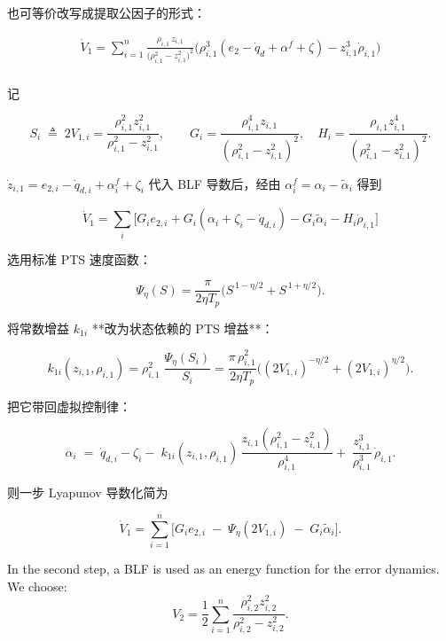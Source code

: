 \documentclass[pdflatex,sn-mathphys-num]{sn-jnl}%
\theoremstyle{thmstyleone}%
\theoremstyle{thmstyletwo}%
\theoremstyle{thmstylethree}%
\begin{document}
也可等价改写成提取公因子的形式：

\begin{equation}\label{eq:25}
	\begin{aligned}
\dot V_1
=\sum_{i=1}^{n}
\frac{\rho_{i,1}\,z_{i,1}}{\big(\rho_{i,1}^{2}-z_{i,1}^{2}\big)^{2}}
\Big(\rho_{i,1}^{3}(e_{2} -\dot{q}_{d}+\alpha^{f}+\zeta)-z_{i,1}^{3}\dot\rho_{i,1}\Big)\\
\end{aligned}
\end{equation}




记

$$
S_i \;\triangleq\;2V_{1,i}=\frac{\rho_{i,1}^2 z_{i,1}^2}{\rho_{i,1}^2-z_{i,1}^2},\qquad
G_i=\frac{\rho_{i,1}^4 z_{i,1}}{(\rho_{i,1}^2-z_{i,1}^2)^2},\quad
H_i=\frac{\rho_{i,1} z_{i,1}^4}{(\rho_{i,1}^2-z_{i,1}^2)^2}.
$$

$\dot z_{i,1}= e_{2,i}-\dot q_{d,i}+\alpha^{f}_i+\zeta_i$ 代入 BLF 导数后，经由
$\alpha^{f}_i=\alpha_i-\tilde\alpha_i$ 得到

$$
\dot V_1=\sum_i\!\Big[G_i e_{2,i}+G_i(\alpha_i+\zeta_i-\dot q_{d,i})-G_i\tilde\alpha_i-H_i\dot\rho_{i,1}\Big]
$$

选用标准 PTS 速度函数：

$$
\Psi_\eta(S)=\frac{\pi}{2\eta T_p}\Big(S^{\,1-\eta/2}+S^{\,1+\eta/2}\Big).
$$

将常数增益 $k_{1i}$ **改为状态依赖的 PTS 增益**：

$$
\boxed{
k_{1i}(z_{i,1},\rho_{i,1})
=\rho_{i,1}^2\;\frac{\Psi_\eta(S_i)}{S_i}
=\frac{\pi\,\rho_{i,1}^2}{2\eta T_p}\Big((2V_{1,i})^{-\eta/2}+(2V_{1,i})^{\eta/2}\Big).
}
$$

把它带回虚拟控制律：

$$
\boxed{
\alpha_i \;=\; \dot q_{d,i}-\zeta_i
-\;k_{1i}(z_{i,1},\rho_{i,1})\,
\frac{z_{i,1}(\rho_{i,1}^2-z_{i,1}^2)}{\rho_{i,1}^4}
+\;\frac{z_{i,1}^3}{\rho_{i,1}^3}\,\dot\rho_{i,1}.
}
$$

则一步 Lyapunov 导数化简为

$$
\boxed{
\dot V_1
= \sum_{i=1}^n \Big[
G_i e_{2,i}\;-\;\Psi_\eta(2V_{1,i})\;-\;G_i\tilde\alpha_i
\Big].
}
$$


In the second step, a BLF is used as an energy function for the error dynamics. We choose:
\begin{equation}\label{eq:25}
	V_2= \frac{1}{2}\sum_{i=1}^{n} \frac{\rho_{i,2}^2 z_{i,2}^2}{\rho_{i,2}^2-z_{i,2}^2}. 
\end{equation}
\end{document}
